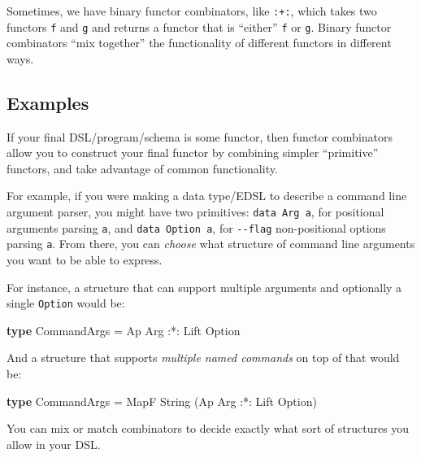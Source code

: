 \documentclass[]{article}
\newenvironment{Shaded}{}{}
\newcommand{\DataTypeTok}[1]{\textcolor[rgb]{0.56,0.13,0.00}{#1}}
\newcommand{\KeywordTok}[1]{\textcolor[rgb]{0.00,0.44,0.13}{\textbf{#1}}}
\newcommand{\NormalTok}[1]{#1}
\newcommand{\OperatorTok}[1]{\textcolor[rgb]{0.40,0.40,0.40}{#1}}
\newcommand{\OtherTok}[1]{\textcolor[rgb]{0.00,0.44,0.13}{#1}}
\begin{document}
Sometimes, we have binary functor combinators, like \texttt{:+:}, which takes
two functors \texttt{f} and \texttt{g} and returns a functor that is ``either''
\texttt{f} or \texttt{g}. Binary functor combinators ``mix together'' the
functionality of different functors in different ways.

\hypertarget{examples}{%
\subsection{Examples}\label{examples}}

If your final DSL/program/schema is some functor, then functor combinators allow
you to construct your final functor by combining simpler ``primitive'' functors,
and take advantage of common functionality.

For example, if you were making a data type/EDSL to describe a command line
argument parser, you might have two primitives: \texttt{data\ Arg\ a}, for
positional arguments parsing \texttt{a}, and \texttt{data\ Option\ a}, for
\texttt{-\/-flag} non-positional options parsing \texttt{a}. From there, you can
\emph{choose} what structure of command line arguments you want to be able to
express.

For instance, a structure that can support multiple arguments and optionally a
single \texttt{Option} would be:

\begin{Shaded}
\begin{Highlighting}[]
\KeywordTok{type} \DataTypeTok{CommandArgs} \OtherTok{=} \DataTypeTok{Ap} \DataTypeTok{Arg} \OperatorTok{:*:} \DataTypeTok{Lift} \DataTypeTok{Option}
\end{Highlighting}
\end{Shaded}

And a structure that supports \emph{multiple named commands} on top of that
would be:

\begin{Shaded}
\begin{Highlighting}[]
\KeywordTok{type} \DataTypeTok{CommandArgs} \OtherTok{=} \DataTypeTok{MapF} \DataTypeTok{String}\NormalTok{ (}\DataTypeTok{Ap} \DataTypeTok{Arg} \OperatorTok{:*:} \DataTypeTok{Lift} \DataTypeTok{Option}\NormalTok{)}
\end{Highlighting}
\end{Shaded}

You can mix or match combinators to decide exactly what sort of structures you
allow in your DSL.
\end{document}
